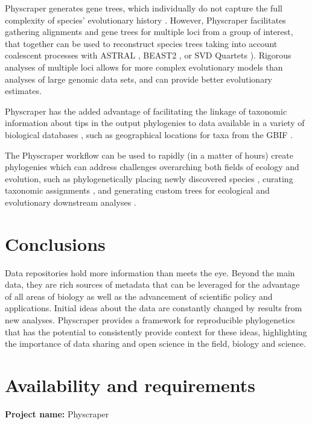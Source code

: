 \documentclass{bmcart}
\begin{document}
Physcraper generates gene trees, which individually do not capture the full complexity
of species' evolutionary history \cite{song2012resolving}.
However, Physcraper facilitates
gathering alignments and gene trees for multiple loci from a group of interest,
that together can be used to reconstruct species trees taking into account coalescent
processes with ASTRAL \cite{mirarab2014astral},
BEAST2 \cite{bouckaert2019beast}, or SVD Quartets \cite{chifman2014quartet}).
Rigorous analyses of multiple loci allows for more complex evolutionary models
than analyses of large genomic data sets, and can provide better evolutionary estimates.

Physcraper has the added advantage of facilitating the linkage of taxonomic information about tips
in the output phylogenies to data available in a variety of biological databases
\cite{rees2017automated}, such as
geographical locations for taxa from the GBIF \cite{gbif_secretariat_gbif_2019}.

The Physcraper workflow can be used to rapidly (in a matter of hours) create
phylogenies which can address challenges overarching both fields of ecology and evolution, such as
phylogenetically placing newly discovered species \cite{webb2010biodiversity},
curating taxonomic assignments
\cite{san2010molecular},
and generating custom trees for ecological \cite{helmus2012phylogenetic} and
evolutionary downstream analyses \cite{stoltzfus2013phylotastic}.

\section*{Conclusions}
Data repositories hold more information than meets the eye.
Beyond the main data, they are rich sources of metadata that can be leveraged
for the advantage of all areas of biology as well as the advancement of scientific
policy and applications.
Initial ideas about the data are constantly changed by results from new analyses.
Physcraper provides a framework for reproducible phylogenetics that has the
potential to consistently provide context for these ideas, highlighting the
importance of data sharing and open science in the field, biology and science.

\section*{Availability and requirements}

\textbf{Project name:} Physcraper
\end{document}
